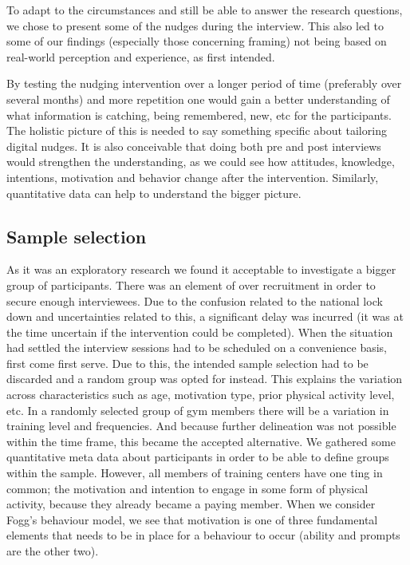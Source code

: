 To adapt to the circumstances and still be able to answer the research questions, we chose to present some of the nudges during the interview. This also led to some of our findings (especially those concerning framing) not being based on real-world perception and experience, as first intended. 

By testing the nudging intervention over a longer period of time (preferably over several months) and more repetition one would gain a better understanding of what information is catching, being remembered, new, etc for the participants. The holistic picture of this is needed to say something specific about tailoring digital nudges. It is also conceivable that doing both pre and post interviews would strengthen the understanding, as we could see how attitudes, knowledge, intentions, motivation and behavior change after the intervention. Similarly, quantitative data can help to understand the bigger picture. 


\subsection{Sample selection}
As it was an exploratory research we found it acceptable to investigate a bigger group of participants. There was an element of over recruitment in order to secure enough interviewees. Due to the confusion related to the national lock down and uncertainties related to this, a significant delay was incurred (it was at the time uncertain if the intervention could be completed). When the situation had settled the interview sessions had to be scheduled on a convenience basis, first come first serve. Due to this, the intended sample selection had to be discarded and a random group was opted for instead. This explains the variation across characteristics such as age, motivation type, prior physical activity level, etc. In a randomly selected group of gym members there will be a variation in training level and frequencies. And because further delineation was not possible within the time frame, this became the accepted alternative. We gathered some quantitative meta data about participants in order to be able to define groups within the sample. However, all members of training centers have one ting in common; the motivation and intention to engage in some form of physical activity, because they already became a paying member. When we consider Fogg's behaviour model, we see that motivation is one of three fundamental elements that needs to be in place for a behaviour to occur (ability and prompts are the other two). 

